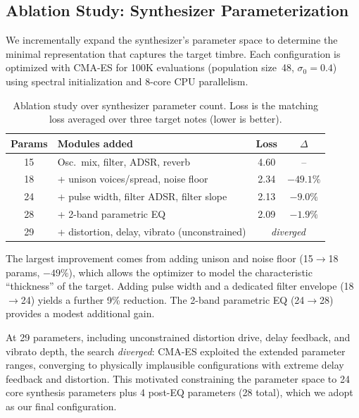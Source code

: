 \subsection{Ablation Study: Synthesizer Parameterization}
\label{sec:ablation}

We incrementally expand the synthesizer's parameter space to determine the minimal representation that captures the target timbre.
Each configuration is optimized with CMA-ES for 100K evaluations (population size~48, $\sigma_0 = 0.4$) using spectral initialization and 8-core CPU parallelism.

\begin{table}[ht]
\centering
\caption{Ablation study over synthesizer parameter count. Loss is the matching loss averaged over three target notes (lower is better).}
\label{tab:ablation}
\begin{tabular}{@{}clcc@{}}
\toprule
\textbf{Params} & \textbf{Modules added} & \textbf{Loss} & \textbf{$\Delta$} \\
\midrule
15 & Osc.\ mix, filter, ADSR, reverb & 4.60 &  --  \\
18 & + unison voices/spread, noise floor & 2.34 & $-49.1\%$ \\
24 & + pulse width, filter ADSR, filter slope & 2.13 & $-9.0\%$ \\
28 & + 2-band parametric EQ & 2.09 & $-1.9\%$ \\
29 & + distortion, delay, vibrato (unconstrained) & \multicolumn{2}{c}{\emph{diverged}} \\
\bottomrule
\end{tabular}
\end{table}

The largest improvement comes from adding unison and noise floor (15$\to$18 params, $-49\%$), which allows the optimizer to model the characteristic ``thickness'' of the target.
Adding pulse width and a dedicated filter envelope (18$\to$24) yields a further 9\% reduction.
The 2-band parametric EQ (24$\to$28) provides a modest additional gain.

At 29 parameters, including unconstrained distortion drive, delay feedback, and vibrato depth, the search \emph{diverged}: CMA-ES exploited the extended parameter ranges, converging to physically implausible configurations with extreme delay feedback and distortion.
This motivated constraining the parameter space to 24 core synthesis parameters plus 4 post-EQ parameters (28 total), which we adopt as our final configuration.


